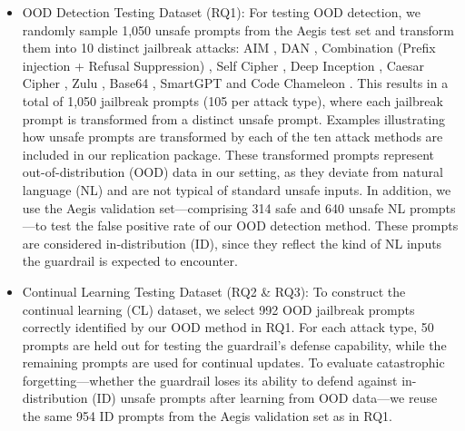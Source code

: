 \begin{itemize}
    \item OOD Detection Testing Dataset (RQ1):
    For testing OOD detection, we randomly sample 1,050 unsafe prompts from the Aegis test set and transform them into 10 distinct jailbreak attacks: AIM \cite{jailbreakchat2023}, DAN \cite{shen2023anything}, Combination (Prefix injection + Refusal Suppression) \cite{wei2024jailbroken}, Self Cipher \cite{yuan2023gpt}, Deep Inception \cite{li2023deepinception}, Caesar Cipher \cite{yuan2023gpt}, Zulu \cite{yong2023low}, Base64 \cite{wei2024jailbroken}, SmartGPT \cite{kang2024exploiting} and Code Chameleon \cite{lv2024codechameleon}. This results in a total of 1,050 jailbreak prompts (105 per attack type), where each jailbreak prompt is transformed from a distinct unsafe prompt. 
    Examples illustrating how unsafe prompts are transformed by each of the ten attack methods are included in our replication package. 
    These transformed prompts represent out-of-distribution (OOD) data in our setting, as they deviate from natural language (NL) and are not typical of standard unsafe inputs.
    In addition, we use the Aegis validation set—comprising 314 safe and 640 unsafe NL prompts—to test the false positive rate of our OOD detection method. These prompts are considered in-distribution (ID), since they reflect the kind of NL inputs the guardrail is expected to encounter.
    
    \item Continual Learning Testing Dataset (RQ2 \& RQ3): 
    To construct the continual learning (CL) dataset, we select 992 OOD jailbreak prompts correctly identified by our OOD method in RQ1. For each attack type, 50 prompts are held out for testing the guardrail’s defense capability, while the remaining prompts are used for continual updates.
    To evaluate catastrophic forgetting—whether the guardrail loses its ability to defend against in-distribution (ID) unsafe prompts after learning from OOD data—we reuse the same 954 ID prompts from the Aegis validation set as in RQ1.
    
\end{itemize}
